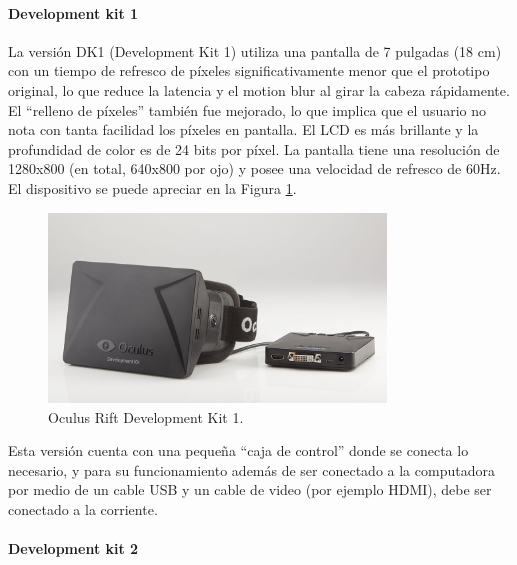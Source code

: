 \documentclass[12pt]{article}
\begin{document}
\paragraph{Development kit 1}
La versión DK1 (Development Kit 1) utiliza una pantalla de 7 pulgadas (18 cm) con un tiempo de refresco de píxeles significativamente menor que el prototipo original, lo que reduce la latencia y el motion blur al girar la cabeza rápidamente. El “relleno de píxeles” también fue mejorado, lo que  implica que el usuario no nota con tanta facilidad los píxeles en pantalla. El LCD es más brillante y la profundidad de color es de 24 bits por píxel. La pantalla tiene una resolución de 1280x800 (en total, 640x800 por ojo) y posee una velocidad de refresco de 60Hz. El dispositivo se puede apreciar en la Figura \ref{dk1}.
\begin{figure}[h!]
\includegraphics[width=0.8\textwidth,center]{dk1.jpg}
\caption{Oculus Rift Development Kit 1.}
\label{dk1}
\end{figure}

Esta versión cuenta con una pequeña “caja de control” donde se conecta lo necesario, y para su funcionamiento además de ser conectado a la computadora por medio de un cable USB y un cable de video (por ejemplo HDMI), debe ser conectado a la corriente. 
\paragraph{Development kit 2}
\end{document}
